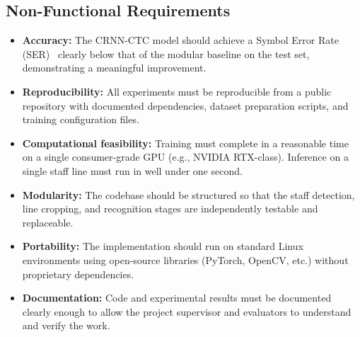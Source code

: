 \documentclass[11pt, a4paper]{article}
\begin{document}
\subsection{Non-Functional Requirements}
\begin{itemize}
    \item \textbf{Accuracy:} The CRNN-CTC model should achieve a Symbol Error Rate (SER)~\cite{SymbolErrorRate} clearly below that of the modular baseline on the test set, demonstrating a meaningful improvement.
    \item \textbf{Reproducibility:} All experiments must be reproducible from a public repository with documented dependencies, dataset preparation scripts, and training configuration files.
    \item \textbf{Computational feasibility:} Training must complete in a reasonable time on a single consumer-grade GPU (e.g., NVIDIA RTX-class). Inference on a single staff line must run in well under one second.
    \item \textbf{Modularity:} The codebase should be structured so that the staff detection, line cropping, and recognition stages are independently testable and replaceable.
    \item \textbf{Portability:} The implementation should run on standard Linux environments using open-source libraries (PyTorch, OpenCV, etc.) without proprietary dependencies.
    \item \textbf{Documentation:} Code and experimental results must be documented clearly enough to allow the project supervisor and evaluators to understand and verify the work.
\end{itemize}
\end{document}
